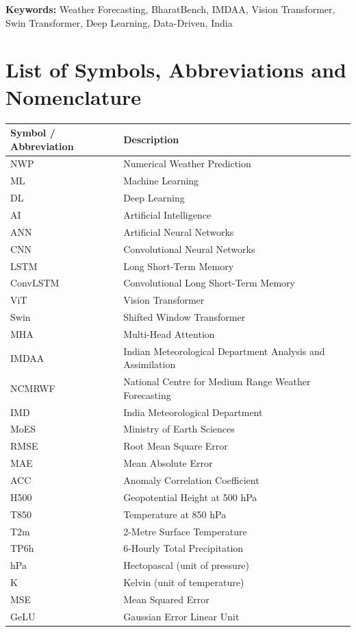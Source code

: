 \documentclass[12pt,a4paper,oneside]{report}
\begin{document}
\vspace{1cm}
\noindent\textbf{Keywords:} Weather Forecasting, BharatBench, IMDAA, Vision Transformer, Swin Transformer, Deep Learning, Data-Driven, India
\newpage

\setcounter{page}{1}
\tableofcontents
\newpage
\listoffigures
\newpage
\listoftables
\newpage

\chapter*{List of Symbols, Abbreviations and Nomenclature}
\begin{tabular}{p{3.5cm} p{10cm}}
\toprule
\textbf{Symbol / Abbreviation} & \textbf{Description} \\
\midrule
NWP     & Numerical Weather Prediction \\
ML      & Machine Learning \\
DL      & Deep Learning \\
AI      & Artificial Intelligence \\
ANN     & Artificial Neural Networks \\
CNN     & Convolutional Neural Networks \\
LSTM    & Long Short-Term Memory \\
ConvLSTM & Convolutional Long Short-Term Memory \\
ViT     & Vision Transformer \\
Swin    & Shifted Window Transformer \\
MHA     & Multi-Head Attention \\
IMDAA   & Indian Meteorological Department Analysis and Assimilation \\
NCMRWF  & National Centre for Medium Range Weather Forecasting \\
IMD     & India Meteorological Department \\
MoES    & Ministry of Earth Sciences \\
RMSE    & Root Mean Square Error \\
MAE     & Mean Absolute Error \\
ACC     & Anomaly Correlation Coefficient \\
H500    & Geopotential Height at 500 hPa \\
T850    & Temperature at 850 hPa \\
T2m     & 2-Metre Surface Temperature \\
TP6h    & 6-Hourly Total Precipitation \\
hPa     & Hectopascal (unit of pressure) \\
K       & Kelvin (unit of temperature) \\
MSE     & Mean Squared Error \\
GeLU    & Gaussian Error Linear Unit \\
\bottomrule
\end{tabular}
\end{document}
